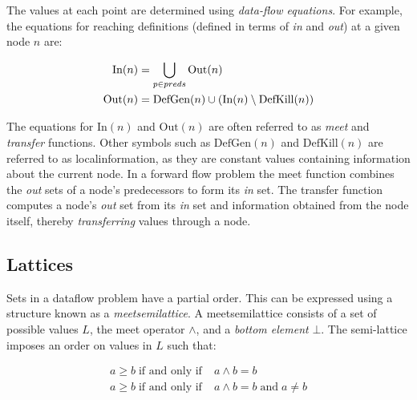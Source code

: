 \documentclass[bsc,twoside,singlespacing,parskip,logo,notimes,normalheadings]{infthesis}
\begin{document}
        The values at each point are determined using {\em data-flow
          equations}. For example, the equations for reaching
        definitions (defined in terms of {\em in} and {\em out}) at a
        given node $n$ are:
        
        \vspace{-7mm}
        \begin{align*}
          \textnormal{In}(n)  & = \bigcup_{p \in preds} \textnormal{Out}(n) \\
          \textnormal{Out}(n) & = \textnormal{DefGen}(n) \cup (\textnormal{In}(n) \setminus \textnormal{DefKill}(n))
        \end{align*}
        
        The equations for $\text{In}(n)$ and $\text{Out}(n)$ are often
        referred to as {\em \gls{meet}} and {\em \gls{transfer}}
        functions. Other symbols such as $\text{DefGen}(n)$ and
        $\text{DefKill}(n)$ are referred to as \gls{localinformation},
        as they are constant values containing information about the
        current node. In a forward flow problem the meet function
        combines the {\em out} sets of a node's predecessors to form
        its {\em in} set. The \gls{transfer} function computes a
        node's {\em out} set from its {\em in} set and information
        obtained from the node itself, thereby {\em transferring}
        values through a node.

	\subsection{Lattices}\label{sec:background_lattices}
	Sets in a \gls{dataflow} problem have a partial order. This
        can be expressed using a structure known as a {\em
          \gls{meetsemilattice}}. A \gls{meetsemilattice} consists of
        a set of possible values $L$, the meet operator $\land$, and a
        {\em bottom element} $\bot$. The semi-lattice imposes an order
        on values in $L$ such that:
        
        \vspace{-1cm}
        \begin{align*}
          a \geq b \;\text{if and only if}\; & a \land b = b \\
          a \ge  b \;\text{if and only if}\; & a \land b = b \;\text{and}\; a \neq b
        \end{align*}
        \vspace{-1cm}
        
\end{document}
